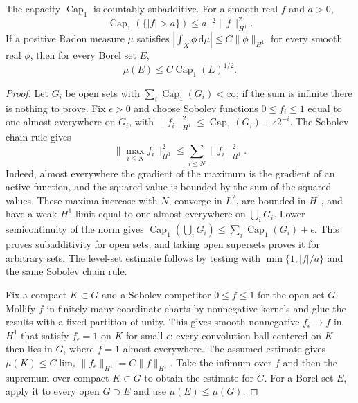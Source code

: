 \begin{lemma}\label{hessian:sobolev-capacity-tools}
The capacity $\operatorname{Cap}_1$ is countably subadditive. For a
smooth real $f$ and $a>0$,
\[
 \operatorname{Cap}_1(\{|f|>a\})\leq a^{-2}\|f\|_{H^1}^2.
\]
If a positive Radon measure $\mu$ satisfies
$|\int_X\phi\,\mathrm d\mu|\leq C\|\phi\|_{H^1}$ for every smooth real
$\phi$, then for every Borel set $E$,
\[
 \mu(E)\leq C\operatorname{Cap}_1(E)^{1/2}.
\]
\end{lemma}
\begin{proof}
Let $G_i$ be open sets with $\sum_i\operatorname{Cap}_1(G_i)<\infty$;
if the sum is infinite there is nothing to prove. Fix $\epsilon>0$ and
choose Sobolev functions $0\leq f_i\leq1$ equal to one almost
everywhere on $G_i$, with
$\|f_i\|_{H^1}^2\leq\operatorname{Cap}_1(G_i)+\epsilon2^{-i}$.
The Sobolev chain rule gives
\[
 \|\max_{i\leq N}f_i\|_{H^1}^2\leq\sum_{i\leq N}\|f_i\|_{H^1}^2.
\]
Indeed, almost everywhere the gradient of the maximum is the gradient
of an active function, and the squared value is bounded by the sum of
the squared values. These maxima increase with $N$, converge in
$L^2$, are bounded in $H^1$, and have a weak $H^1$ limit equal to one
almost everywhere on $\bigcup_iG_i$. Lower semicontinuity of the norm
gives
$\operatorname{Cap}_1(\bigcup_iG_i)\leq\sum_i\operatorname{Cap}_1(G_i)+\epsilon$.
This proves subadditivity for open sets, and taking open supersets
proves it for arbitrary sets.
The level-set estimate follows by testing with
$\min\{1,|f|/a\}$ and the same Sobolev chain rule.

Fix a compact $K\subset G$ and a Sobolev competitor $0\leq f\leq1$
for the open set $G$. Mollify $f$ in finitely many coordinate charts
by nonnegative kernels and glue the results with a fixed partition of
unity. This gives smooth nonnegative $f_\epsilon\to f$ in $H^1$ that
satisfy $f_\epsilon=1$ on $K$ for small $\epsilon$: every convolution
ball centered on $K$ then lies in $G$, where $f=1$ almost everywhere.
The assumed estimate gives
$\mu(K)\leq C\lim_\epsilon\|f_\epsilon\|_{H^1}=C\|f\|_{H^1}$.
Take the infimum over $f$ and then the supremum over compact $K\subset G$
to obtain the estimate for $G$. For a Borel set $E$, apply it to
every open $G\supset E$ and use $\mu(E)\leq\mu(G)$.
\end{proof}

